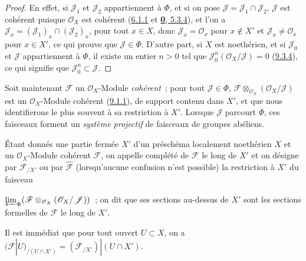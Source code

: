 \begin{proof}
En effet, si $\mathscr{J}_1$ et $\mathscr{J}_2$ appartiennent à $\Phi$, et
si on pose $\mathscr{J}=\mathscr{J}_1\cap\mathscr{J}_2$,
$\mathscr{J}$ est cohérent puisque $\mathscr{O}_X$ est cohérent
(\hyperref[I.6.1.1-fr]{6.1.1} et
\hyperref[0.5.3.4-fr]{\textbf{0}, 5.3.4}), et l'on a
$\mathscr{J}_x=(\mathscr{J}_1)_x\cap(\mathscr{J}_2)_x$, pour tout
$x\in X$, donc $\mathscr{J}_x=\mathscr{O}_x$ pour $x\notin X'$ et
$\mathscr{J}_x\neq\mathscr{O}_x$ pour $x\in X'$, ce qui prouve que
$\mathscr{J}\in\Phi$. D'autre part, si $X$ est noethérien, et si
$\mathscr{J}_0$ et $\mathscr{J}$ appartiennent à $\Phi$, il existe un
entier $n>0$ tel que
$\mathscr{J}_0^n(\mathscr{O}_X/\mathscr{J})=0$
(\hyperref[I.9.3.4-fr]{9.3.4}), ce qui signifie que
$\mathscr{J}_0^n\subset\mathscr{J}$.
\end{proof}

\begin{env}[10.8.3]
\label{I.10.8.3-fr}
Soit maintenant $\mathscr{F}$ un $\mathscr{O}_X$-Module \emph{cohérent}~; pour
tout $\mathscr{J}\in\Phi$,
$\mathscr{F}\otimes_{\mathscr{O}_X}(\mathscr{O}_X/\mathscr{J})$ est un
$\mathscr{O}_X$-Module cohérent
(\hyperref[I.9.1.1-fr]{9.1.1}), de support contenu dans $X'$, et que nous
identifierons le plus souvent à sa restriction à $X'$. Lorsque
$\mathscr{J}$ parcourt $\Phi$, ces faisceaux forment un
\emph{système projectif} de faisceaux de groupes abéliens.
\end{env}

\begin{definition}[10.8.4]
\label{I.10.8.4-fr}
Étant donnés une partie fermée $X'$ d'un préschéma localement noethérien
$X$ et un $\mathscr{O}_X$-Module cohérent $\mathscr{F}$, on appelle
complété de $\mathscr{F}$ le long de $X'$ et on désigne par
$\mathscr{F}_{/X'}$ ou par $\widehat{\mathscr{F}}$ (lorsqu'aucune confusion
n'est possible) la restriction à $X'$ du faisceau


$\varprojlim_{\Phi}
(\mathscr{F}\otimes_{\mathscr{O}_X}
(\mathscr{O}_X/\mathscr{J}))$~; on dit que ses sections au-dessus de $X'$ sont
les sections formelles de $\mathscr{F}$ le long de $X'$.
\end{definition}

Il est immédiat que pour tout ouvert $U\subset X$, on a
$(\mathscr{F}|U)_{/(U\cap X')}=(\mathscr{F}_{/X'})|(U\cap X')$.

